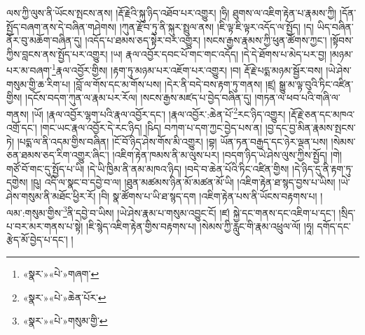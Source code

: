 ལས་ཀྱི་ལུས་ནི་ཡོངས་སྤངས་ནས། །རྡོ་རྗེའི་སྐུ་ཉིད་འཐོབ་པར་འགྱུར། །ཧྲི། ཐུགས་ལ་འཇིག་རྟེན་པ་རྣམས་ཀྱི། །དོན་སྤྱོད་བཞག་ནས་དེ་བཞིན་གཤེགས། །ཀུན་རྫོབ་ཏུ་ནི་སྐུར་སྤྲུལ་ནས། །ཇི་ལྟ་ཇི་ལྟར་འདོད་ལ་སྤྱོད། །ད། ཡིད་བཞིན་ནོར་བུ་མཆོག་བཞིན་དུ། །འདོད་པ་ཐམས་ཅད་སྟེར་བར་འགྱུར། །སངས་རྒྱས་རྣམས་ཀྱི་ཕུན་ཚོགས་ཀྱང་། །སྟོབས་ཀྱིས་བླངས་ནས་སྤྱོད་པར་འགྱུར། །ཡ། རྣལ་འབྱོར་དབང་པོ་གང་གང་འདོད། །དེ་དེ་ཐོགས་པ་མེད་པར་བྱ། །མཉམ་པར་མ་བཞག་\footnote{«སྣར་»«པེ་»གཞག་}རྣལ་འབྱོར་གྱིས། །རྟག་ཏུ་མཉམ་པར་འཇོག་པར་འགྱུར། །བ། རྡོ་རྗེ་པདྨ་མཉམ་སྦྱོར་བས། །ཡེ་ཤེས་གསུམ་གྱི་ཆ་རིག་པ། །བློ་ལ་གོས་དང་མ་གོས་པས། །དེར་ནི་བདེ་བས་རྟག་ཏུ་གནས། །ཛྲ། སྒྱུ་མ་ལྟ་བུའི་ཏིང་འཛིན་གྱིས། །དངོས་བདག་ཀུན་ལ་རྣམ་པར་རོལ། །སངས་རྒྱས་མཛད་པ་བྱེད་བཞིན་དུ། །གཏན་ལ་ཕབ་པའི་གཞི་ལ་གནས། །ཡོ། །རྣལ་འབྱོར་ལྷག་པའི་རྣལ་འབྱོར་དང་། །རྣལ་འབྱོར་:ཆེན་པོ་\footnote{«སྣར་»«པེ་»ཆེན་པོར་}རང་ཉིད་འགྱུར། །རྡོ་རྗེ་ཅན་དང་མཁའ་འགྲོ་དང་། །གང་ཡང་རྣལ་འབྱོར་དེ་རང་ཉིད། །ཥིད། བཀག་པ་དག་ཀྱང་བྱེད་པས་ན། །བྱ་དང་བྱ་མིན་རྣམས་སྤངས་ཏེ། །པདྨ་ལ་ནི་འདམ་གྱིས་བཞིན། །ངོ་བོ་ཉིད་ཤེས་གོས་མི་འགྱུར། །བྷ། ཡོན་ཏན་བརྒྱད་དང་ཉེར་ལྡན་པས། །སེམས་ཅན་ཐམས་ཅད་རིག་འགྱུར་ཞིང་། །འཇིག་རྟེན་ཁམས་ནི་མ་ལུས་པར། །བདག་ཉིད་ཡེ་ཤེས་ལུས་ཀྱིས་སྤྱོད། །གེ། གཙོ་བོ་གང་དུ་སྤྱོད་པ་ཡི། །དེ་ཡི་ཁྱིམ་ནི་ནམ་མཁའ་ཉིད། །བདེ་བ་ཆེན་པོའི་ཏིང་འཛིན་གྱིས། །དེ་ཉིད་དུ་ནི་རྟག་ཏུ་དགྱེས། །ཥུ། འདི་ལ་སྣང་བ་དབྱེ་བ་ལ། །ཐུན་མཚམས་ཉིན་མོ་མཚན་མོ་ཡི། །འཇིག་རྟེན་ཐ་སྙད་བྱས་པ་ཡིས། །ཡེ་ཤེས་གསུམ་ནི་མཐོང་ཕྱིར་རོ། །བི། སྣ་ཚོགས་པ་ཡི་ཐ་སྙད་དག །འཇིག་རྟེན་པས་ནི་ཡོངས་བརྟགས་པ། །ལམ་:གསུམ་གྱིས་\footnote{«སྣར་»«པེ་»གསུམ་གྱི་}ནི་དབྱེ་བ་ཡིས། །ཡེ་ཤེས་རྣམ་པ་གསུམ་འབྱུང་ངོ། །ཛ། སྐྱེ་དང་གནས་དང་འཇིག་པ་དང་། །སྲིད་པ་བར་མར་གནས་པ་སྟེ། །ཇི་སྙེད་འཇིག་རྟེན་གྱིས་བརྟགས་པ། །སེམས་ཀྱི་རླུང་གི་རྣམ་འཕྲུལ་ལོ། །ཧཱ། དགོད་དང་རྩེད་མོ་བྱེད་པ་དང་། །

